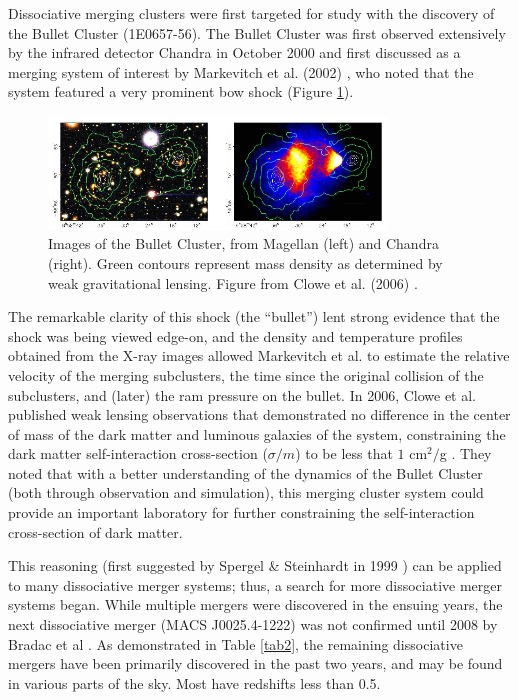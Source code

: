 \documentclass[12 pt]{article}
\renewcommand{\baselinestretch}{2}
\begin{document}
Dissociative merging clusters were first targeted for study with the discovery of the Bullet Cluster (1E0657-56). The Bullet Cluster was first observed extensively by the infrared detector Chandra in October 2000 and first discussed as a merging system of interest by Markevitch et al. (2002) \cite{Markevitch02}, who noted that the system featured a very prominent bow shock (Figure \ref{bullet}).

\renewcommand{\baselinestretch}{1}
\begin{figure}[h]
\caption{Images of the Bullet Cluster, from Magellan (left) and Chandra (right). Green contours represent mass density as determined by weak gravitational lensing. Figure from Clowe et al. (2006) \cite{Clowe06}.}
\label{bullet}
\centering
\includegraphics[width=0.8\textwidth]{cloweetal2006}
\end{figure}
\renewcommand{\baselinestretch}{2}

The remarkable clarity of this shock (the “bullet”) lent strong evidence that the shock was being viewed edge-on, and the density and temperature profiles obtained from the X-ray images allowed Markevitch et al. to estimate the relative velocity of the merging subclusters, the time since the original collision of the subclusters, and (later) the ram pressure on the bullet. In 2006, Clowe et al. published weak lensing observations that demonstrated no difference in the center of mass of the dark matter and luminous galaxies of the system, constraining the dark matter self-interaction cross-section ($\sigma/m$) to be less that $1$ cm$^2/$g \cite{Clowe06}. They noted that with a better understanding of the dynamics of the Bullet Cluster (both through observation and simulation), this merging cluster system could provide an important laboratory for further constraining the self-interaction cross-section of dark matter.

This reasoning (first suggested by Spergel \& Steinhardt in 1999 \cite{Spergel99}) can be applied to many dissociative merger systems; thus, a search for more dissociative merger systems began. While multiple mergers were discovered in the ensuing years, the next dissociative merger (MACS J0025.4-1222) was not confirmed until 2008 by Bradac et al \cite{Bradac08}. As demonstrated in Table \ref{tab2}, the remaining dissociative mergers have been primarily discovered in the past two years, and may be found in various parts of the sky. Most have redshifts less than 0.5.
\end{document}
